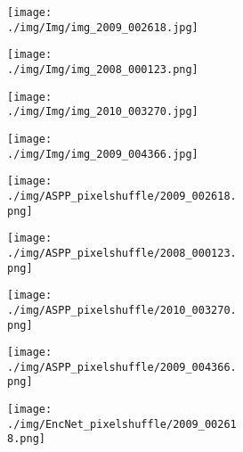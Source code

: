 \documentclass[10pt,twocolumn,letterpaper]{article}
\begin{document}
\begin{figure}[t]
\center
    \begin{subfigure}[t]{0.155\textwidth}
            \begin{subfigure}[t]{\textwidth}
                \texttt{[image: ./img/Img/img\_2009\_002618.jpg]}
            \end{subfigure}\vspace{.1ex}
            \begin{subfigure}[t]{\textwidth}
                \texttt{[image: ./img/Img/img\_2008\_000123.png]}
            \end{subfigure}\vspace{.1ex}
         \begin{subfigure}[t]{\textwidth}
                \texttt{[image: ./img/Img/img\_2010\_003270.jpg]}
            \end{subfigure}\vspace{.1ex}
            \begin{subfigure}[t]{\textwidth}
                \texttt{[image: ./img/Img/img\_2009\_004366.jpg]}
            \end{subfigure}
     \end{subfigure}
\begin{subfigure}[t]{0.155\textwidth}
        \begin{subfigure}[t]{\textwidth}
                \texttt{[image: ./img/ASPP\_pixelshuffle/2009\_002618.png]}
            \end{subfigure}\vspace{.1ex}
        \begin{subfigure}[t]{\textwidth}
                \texttt{[image: ./img/ASPP\_pixelshuffle/2008\_000123.png]}
            \end{subfigure}\vspace{.1ex}
        \begin{subfigure}[t]{\textwidth}
                \texttt{[image: ./img/ASPP\_pixelshuffle/2010\_003270.png]}
            \end{subfigure}\vspace{.1ex}
            \begin{subfigure}[t]{\textwidth}
                \texttt{[image: ./img/ASPP\_pixelshuffle/2009\_004366.png]}
            \captionsetup{justification=centering}
        \label{d}
            \end{subfigure}
    \end{subfigure}
\begin{subfigure}[t]{0.155\textwidth}
        \begin{subfigure}[t]{\textwidth}
                \texttt{[image: ./img/EncNet\_pixelshuffle/2009\_002618.png]}
            \end{subfigure}\vspace{.1ex}


\end{subfigure}
\end{figure}
\end{document}
